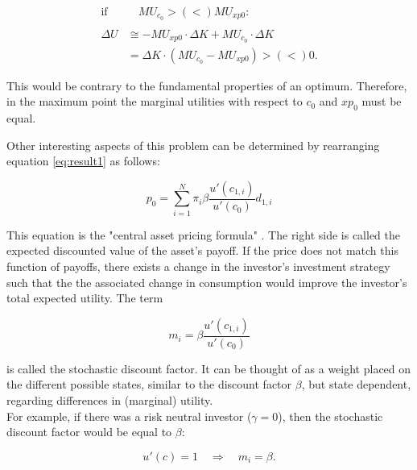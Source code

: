 \begin{align*}
    \text{if} & \quad MU_{c_0} >(<) MU_{xp0}:\\
    \\
    \Delta U & \cong -MU_{xp0} \cdot \Delta K + MU_{c_0} \cdot \Delta K\\
    & = \Delta K \cdot (MU_{c_0} - MU_{xp0}) >(<) 0. 
\end{align*}

\bigskip

\noindent This would be contrary to the fundamental properties of an optimum. Therefore, in the maximum point the marginal utilities with respect to $c_0$ and $xp_0$ must be equal.

\vspace{10mm}

\noindent Other interesting aspects of this problem can be determined by rearranging equation \eqref{eq:result1} as follows:

\begin{equation}\label{eq:pricing_eq1}
    p_0 = \sum_{i=1}^{N} \pi_i \beta \frac{u'(c_{1,i})}{u'(c_0)} d_{1,i}
\end{equation}

\bigskip

\noindent This equation is the "central asset pricing formula" 
\citep[p. 6]{cochrane2001asset}. The right side is called the expected discounted value of the asset's payoff. If the price does not match this function of payoffs, there exists a change in the investor’s investment strategy such that the the associated change in consumption would improve the investor’s total expected utility. The term

\begin{equation}\label{eq:stochastic_disc_fac}
    m_i = \beta \frac{u'(c_{1,i})}{u'(c_0)}
\end{equation}

\bigskip

\noindent is called the stochastic discount factor. It can be thought of as a weight placed on the different possible states, similar to the discount factor $\beta$, but state dependent, regarding differences in (marginal) utility.\\
For example, if there was a risk neutral investor ($\gamma = 0$), then the stochastic discount factor would be equal to $\beta$:

\begin{equation*}
    u'(c) = 1 \quad \Rightarrow \quad m_i = \beta.
\end{equation*}

